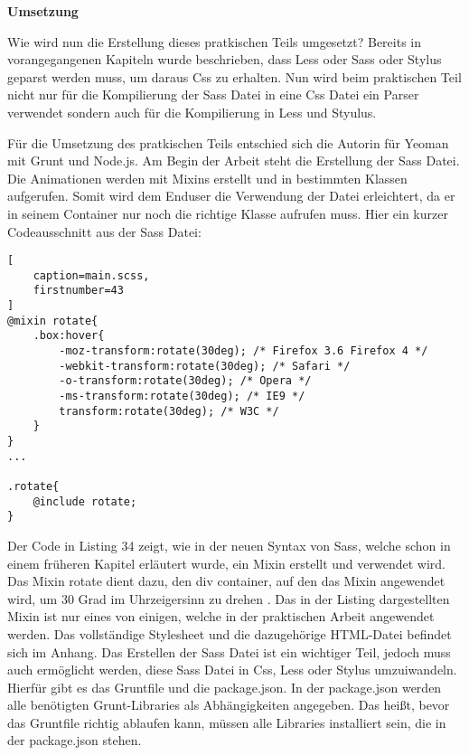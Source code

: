 \textbf{Umsetzung}

Wie wird nun die Erstellung dieses pratkischen Teils umgesetzt? \newline
Bereits in vorangegangenen Kapiteln wurde beschrieben, dass Less oder Sass oder Stylus geparst werden muss, um daraus Css zu erhalten. Nun wird beim praktischen Teil nicht nur für die Kompilierung der Sass Datei in eine Css Datei ein Parser verwendet sondern auch für die Kompilierung in Less und Styulus.

Für die Umsetzung des pratkischen Teils entschied sich die Autorin für Yeoman mit Grunt und Node.js.\newline
Am Begin der Arbeit steht die Erstellung der Sass Datei. Die Animationen werden mit Mixins erstellt und in bestimmten Klassen aufgerufen. Somit wird dem Enduser die Verwendung der Datei erleichtert, da er in seinem Container nur noch die richtige Klasse aufrufen muss.
Hier ein kurzer Codeausschnitt aus der Sass Datei:
\begin{lstlisting}[
	caption=main.scss,
	firstnumber=43
]
@mixin rotate{
	.box:hover{
		-moz-transform:rotate(30deg); /* Firefox 3.6 Firefox 4 */
		-webkit-transform:rotate(30deg); /* Safari */
		-o-transform:rotate(30deg); /* Opera */
		-ms-transform:rotate(30deg); /* IE9 */
		transform:rotate(30deg); /* W3C */
	}
}
...

.rotate{
	@include rotate;
}

\end{lstlisting}
Der Code in Listing 34 zeigt, wie in der neuen Syntax von Sass, welche schon in einem früheren Kapitel erläutert wurde, ein Mixin erstellt und verwendet wird. \newline
Das Mixin rotate dient dazu, den div container, auf den das Mixin angewendet wird, um 30 Grad im Uhrzeigersinn zu drehen . Das in der Listing dargestellten Mixin ist nur eines von einigen, welche in der praktischen Arbeit angewendet werden. Das vollständige Stylesheet und die dazugehörige HTML-Datei befindet sich im Anhang. \newline\newline
Das Erstellen der Sass Datei ist ein wichtiger Teil, jedoch muss auch ermöglicht werden, diese Sass Datei in Css, Less oder Stylus umzuiwandeln. Hierfür gibt es das Gruntfile und die package.json.
In der package.json werden alle benötigten Grunt-Libraries als Abhängigkeiten angegeben. Das heißt, bevor das Gruntfile richtig ablaufen kann, müssen alle Libraries installiert sein, die in der package.json stehen.\newline

